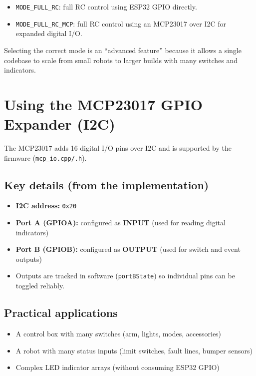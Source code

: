 \begin{itemize}
    \item \texttt{MODE\_FULL\_RC}: full RC control using ESP32 GPIO directly.
    \item \texttt{MODE\_FULL\_RC\_MCP}: full RC control using an MCP23017 over I2C for expanded digital I/O.
\end{itemize}

Selecting the correct mode is an ``advanced feature'' because it allows a single codebase to scale from
small robots to larger builds with many switches and indicators.

\section{Using the MCP23017 GPIO Expander (I2C)}
\label{sec:mcp23017}

The MCP23017 adds 16 digital I/O pins over I2C and is supported by the firmware (\texttt{mcp\_io.cpp/.h}).

\subsection{Key details (from the implementation)}
\begin{itemize}
    \item \textbf{I2C address:} \texttt{0x20}
    \item \textbf{Port A (GPIOA):} configured as \textbf{INPUT} (used for reading digital indicators)
    \item \textbf{Port B (GPIOB):} configured as \textbf{OUTPUT} (used for switch and event outputs)
    \item Outputs are tracked in software (\texttt{portBState}) so individual pins can be toggled reliably.
\end{itemize}

\subsection{Practical applications}
\begin{itemize}
    \item A control box with many switches (arm, lights, modes, accessories)
    \item A robot with many status inputs (limit switches, fault lines, bumper sensors)
    \item Complex LED indicator arrays (without consuming ESP32 GPIO)
\end{itemize}

